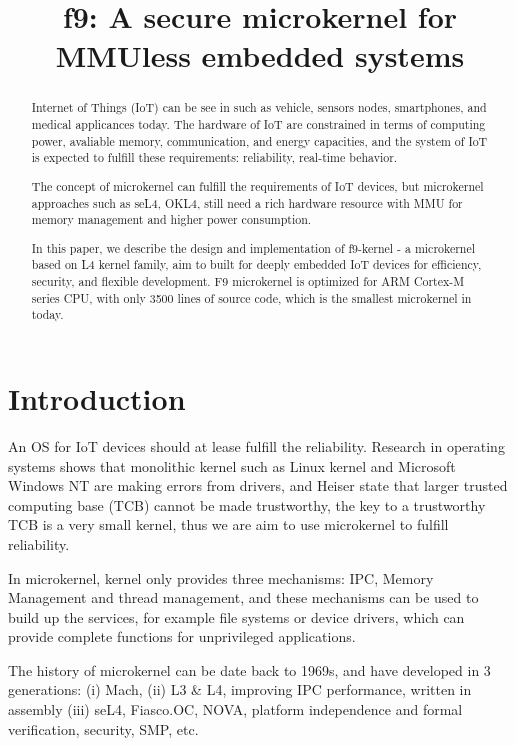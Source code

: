 \documentclass[10pt,preprint,nocopyrightspace]{sigplanconf}
\date{}
\begin{document}
\title{f9: A secure microkernel for MMUless embedded systems} 
\maketitle

\begin{abstract}\textsl{}
	
Internet of Things (IoT) can be see in such as vehicle, sensors nodes, smartphones, and medical applicances today. The hardware of IoT are constrained in terms of computing power, avaliable memory, communication, and energy capacities, and the system of IoT is expected to fulfill these requirements: reliability, real-time behavior. 

The concept of microkernel can fulfill the requirements of IoT devices, but microkernel approaches such as seL4, OKL4, still need a rich hardware resource with MMU for memory management and higher power consumption.

In this paper, we describe the design and implementation of f9-kernel - a microkernel based on L4 kernel family, aim to built for deeply embedded IoT devices for efficiency, security, and flexible development. F9 microkernel is optimized for ARM Cortex-M series CPU, with only 3500 lines of source code, which is the smallest microkernel in today.

\end{abstract}

\section{Introduction}

An OS for IoT devices should at lease fulfill the reliability\cite{baccelli2013riot}. Research in operating systems shows that monolithic kernel such as Linux kernel\cite{chou2001empirical} and Microsoft Windows NT\cite{swift2005improving} are making errors from drivers, and Heiser state that larger trusted computing base (TCB) cannot be made trustworthy, the key to a trustworthy TCB is a very small kernel\cite{heiser2005secure}, thus we are aim to use microkernel to fulfill reliability.

In microkernel, kernel only provides three mechanisms: IPC, Memory Management and thread management, and these mechanisms can be used to build up the services, for example file systems or device drivers, which can provide complete functions for unprivileged applications. 

The history of microkernel can be date back to 1969s, and have developed in 3 generations: (i) Mach, (ii) L3 \& L4, improving IPC performance, written in assembly (iii) seL4, Fiasco.OC, NOVA, platform independence and formal verification, security, SMP, etc. 
\end{document}
